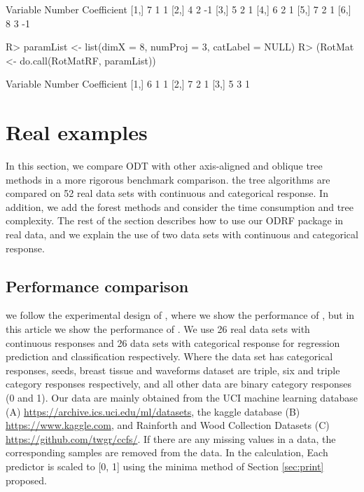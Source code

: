 \documentclass[nojss]{jss}
\numberwithin{equation}{section}
\begin{document}
\begin{Schunk}
\begin{Sinput}
\end{Sinput}
\begin{Soutput}
     Variable Number Coefficient
[1,]        7      1           1
[2,]        4      2          -1
[3,]        5      2           1
[4,]        6      2           1
[5,]        7      2           1
[6,]        8      3          -1
\end{Soutput}
\begin{Sinput}
R> paramList <- list(dimX = 8, numProj = 3, catLabel = NULL)
R> (RotMat <- do.call(RotMatRF, paramList))
\end{Sinput}
\begin{Soutput}
     Variable Number Coefficient
[1,]        6      1           1
[2,]        7      2           1
[3,]        5      3           1
\end{Soutput}
\end{Schunk}

\section{Real examples} \label{sec:examples}
In this section, we compare ODT with other axis-aligned and oblique tree methods in a more rigorous benchmark comparison. the tree algorithms are compared on 52 real data sets with continuous and categorical response. In addition, we add the forest methods and consider the time consumption and tree complexity. The rest of the section describes how to use our ODRF package in real data, and we explain the use of two data sets with continuous and categorical response.

\subsection{Performance comparison}
we follow the experimental design of \cite{zhan2022consistency}, where we show the performance of  , but in this article we show the performance of . We use 26 real data sets with continuous responses  and 26 data sets with categorical response for regression prediction and classification respectively. Where the data set has categorical responses, seeds, breast tissue and waveforms dataset are triple, six and triple category responses respectively, and all other data are binary category responses (0 and 1). Our data are mainly obtained from the UCI machine learning database (A) \url{https://archive.ics.uci.edu/ml/datasets}, the kaggle database (B) \url{https://www.kaggle.com}, and Rainforth and Wood \cite{rainforth2015canonical} Collection Datasets (C) \url{https://github.com/twgr/ccfs/}.
If there are any missing values in a data, the corresponding samples are removed from the data. In the calculation, Each predictor is scaled to [0, 1] using the minima method of Section \ref{sec:print} proposed.
\end{document}
